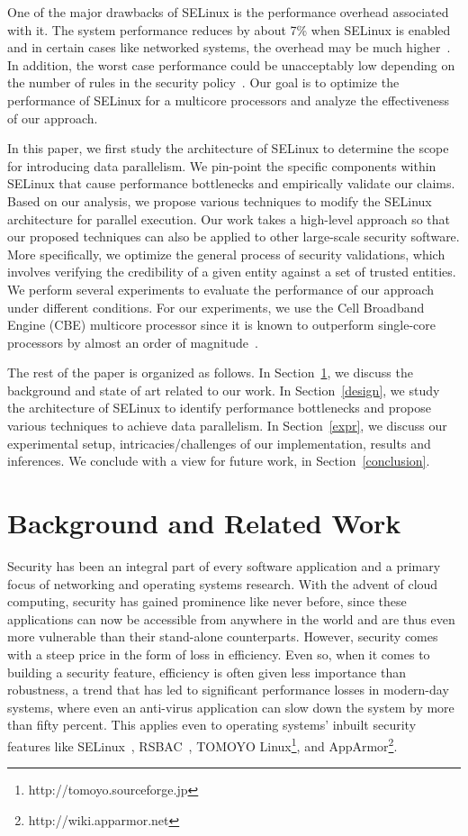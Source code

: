\documentclass[conference]{IEEEtran}
\begin{document}
One of the major drawbacks of SELinux is the performance overhead
associated with it. The system performance reduces by about 7\% when
SELinux is enabled and in certain cases like networked systems, the
overhead may be much higher~\cite{selinuxFAQ}.  In addition, the worst
case performance could be unacceptably low depending on the number of
rules in the security policy~\cite{report}.  Our goal is to optimize
the performance of SELinux for a multicore processors and analyze the
effectiveness of our approach.

In this paper, we first study the architecture of SELinux to determine
the scope for introducing data parallelism.  We pin-point the specific
components within SELinux that cause performance bottlenecks and
empirically validate our claims.  Based on our analysis, we propose
various techniques to modify the SELinux architecture for parallel
execution.  Our work takes a high-level approach so that our proposed
techniques can also be applied to other large-scale security
software.  More specifically, we optimize the general process of
security validations, which involves verifying the credibility of a
given entity against a set of trusted entities.  We perform several
experiments to evaluate the performance of our approach under
different conditions.  For our experiments, we use the Cell Broadband
Engine (CBE) multicore processor since it is known to outperform
single-core processors by almost an order of magnitude~\cite{CBEArch}.

The rest of the paper is organized as follows.  In
Section~\ref{background}, we discuss the background and state of art
related to our work.  In Section~\ref{design}, we study the
architecture of SELinux to identify performance bottlenecks and
propose various techniques to achieve data parallelism.  In
Section~\ref{expr}, we discuss our experimental setup,
intricacies/challenges of our implementation, results and inferences.
We conclude with a view for future work, in Section~\ref{conclusion}.

\section{Background and Related Work}\label{background}

Security has been an integral part of every software application and a
primary focus of networking and operating systems research.  With the
advent of cloud computing, security has gained prominence like never
before, since these applications can now be accessible from anywhere
in the world and are thus even more vulnerable than their stand-alone
counterparts.  However, security comes with a steep price in the form
of loss in efficiency.  Even so, when it comes to building a security
feature, efficiency is often given less importance than robustness, a
trend that has led to significant performance losses in modern-day
systems, where even an anti-virus application can slow down the system
by more than fifty percent.  This applies even to operating systems'
inbuilt security features like SELinux~\cite{s1}, RSBAC~\cite{s2},
TOMOYO Linux\footnote{http://tomoyo.sourceforge.jp}, and
AppArmor\footnote{http://wiki.apparmor.net}.
\end{document}

